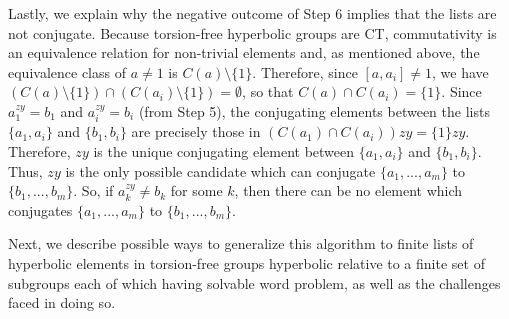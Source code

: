 \documentclass[12pt]{article}
\newcommand{\vs}{\vskip10pt}
\begin{document}
	\vs 
	
	Lastly, we explain why the negative outcome of Step 6 implies that the lists are not conjugate. Because torsion-free hyperbolic groups are CT, commutativity is an equivalence relation for non-trivial elements and, as mentioned above, the equivalence class of $a \neq 1$ is $C(a) \setminus \{1\}$. Therefore, since $[a, a_i] \neq 1$, we have $(C(a) \setminus \{1\}) \cap (C(a_i) \setminus \{1\}) = \emptyset$, so that $C(a) \cap C(a_i) = \{1\}$. Since $a_1^{zy} = b_1$ and $a_i^{zy} = b_i$ (from Step 5), the conjugating elements between the lists $\{a_1, a_i\}$ and $\{b_1, b_i\}$ are precisely those in $(C(a_1) \cap C(a_i))zy = \{1\}zy$. Therefore, $zy$ is the unique conjugating element between $\{a_1, a_i\}$ and $\{b_1, b_i\}$. Thus, $zy$ is the only possible candidate which can conjugate $\{a_1,...,a_m\}$ to $\{b_1,...,b_m\}$. So, if $a_k^{zy} \neq b_k$ for some $k$, then there can be no element which conjugates $\{a_1,...,a_m\}$ to $\{b_1,...,b_m\}$. 
	
	\vs 
	
	Next, we describe possible ways to generalize this algorithm to finite lists of hyperbolic elements in torsion-free groups hyperbolic relative to a finite set of subgroups each of which having solvable word problem, as well as the challenges faced in doing so. 
	
	\vs 
	
\end{document}
